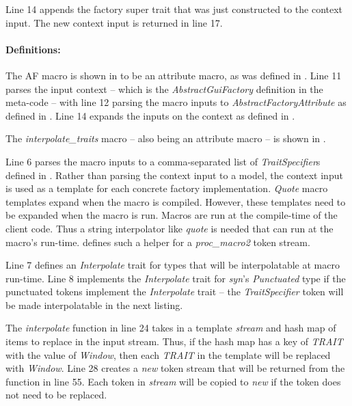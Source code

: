 Line 14 appends the factory super trait that was just constructed to the context input.
The new context input is returned in line 17.

\paragraph{Definitions:}
The AF macro is shown in  to be an attribute macro, as was defined in .
Line 11 parses the input context -- which is the \textit{AbstractGuiFactory} definition in the meta-code -- with line 12 parsing the macro inputs to \textit{AbstractFactoryAttribute} as defined in .
Line 14 expands the inputs on the context as defined in .

The \textit{interpolate\_traits} macro -- also being an attribute macro -- is shown in .

Line 6 parses the macro inputs to a comma-separated list of \textit{TraitSpecifier}s defined in .
Rather than parsing the context input to a model, the context input is used as a template for each concrete factory implementation.
\textit{Quote} macro templates expand when the macro is compiled.
However, these templates need to be expanded when the macro is run.
Macros are run at the compile-time of the client code.
Thus a string interpolator like \textit{quote} is needed that can run at the macro's run-time.
 defines such a helper for a \textit{proc\_macro2} token stream.

Line 7 defines an \textit{Interpolate} trait for types that will be interpolatable at macro run-time.
Line 8 implements the \textit{Interpolate} trait for \textit{syn}'s \textit{Punctuated} type if the punctuated tokens implement the \textit{Interpolate} trait -- the \textit{TraitSpecifier} token will be made interpolatable in the next listing.

The \textit{interpolate} function in line 24 takes in a template \textit{stream} and hash map of items to replace in the input stream.
Thus, if the hash map has a key of \textit{TRAIT} with the value of \textit{Window}, then each \textit{TRAIT} in the template will be replaced with \textit{Window}.
Line 28 creates a \textit{new} token stream that will be returned from the function in line 55.
Each token in \textit{stream} will be copied to \textit{new} if the token does not need to be replaced.

